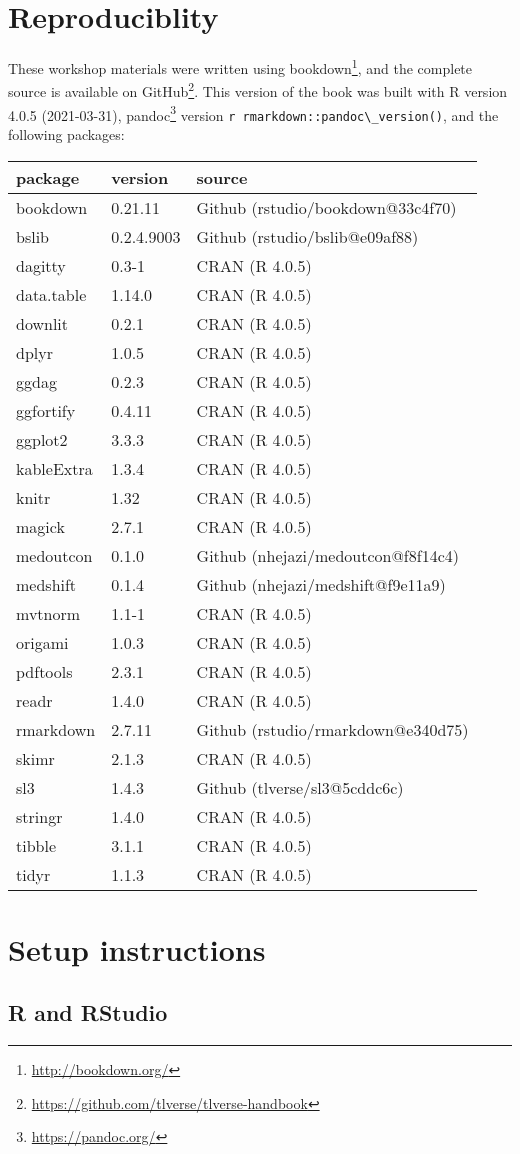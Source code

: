 \documentclass[
  12pt, krantz2,
]{book}
\newcommand{\passthrough}[1]{#1}
\renewcommand{\href}[2]{#2\footnote{\url{#1}}}
\theoremstyle{definition}
\theoremstyle{definition}
\theoremstyle{definition}
\newcommand{\1}{\mathbbm{1}}
\begin{document}
\hypertarget{repro}{%
\section{Reproduciblity}\label{repro}}

These workshop materials were written using \href{http://bookdown.org/}{bookdown},
and the complete source is available on
\href{https://github.com/tlverse/tlverse-handbook}{GitHub}. This version of the book
was built with R version 4.0.5 (2021-03-31), \href{https://pandoc.org/}{pandoc} version \passthrough{\lstinline!r rmarkdown::pandoc\_version()!}, and the following packages:

\begin{longtable}[]{@{}lll@{}}
\toprule
package & version & source\tabularnewline
\midrule
\endhead
bookdown & 0.21.11 & Github (rstudio/bookdown@33c4f70)\tabularnewline
bslib & 0.2.4.9003 & Github (rstudio/bslib@e09af88)\tabularnewline
dagitty & 0.3-1 & CRAN (R 4.0.5)\tabularnewline
data.table & 1.14.0 & CRAN (R 4.0.5)\tabularnewline
downlit & 0.2.1 & CRAN (R 4.0.5)\tabularnewline
dplyr & 1.0.5 & CRAN (R 4.0.5)\tabularnewline
ggdag & 0.2.3 & CRAN (R 4.0.5)\tabularnewline
ggfortify & 0.4.11 & CRAN (R 4.0.5)\tabularnewline
ggplot2 & 3.3.3 & CRAN (R 4.0.5)\tabularnewline
kableExtra & 1.3.4 & CRAN (R 4.0.5)\tabularnewline
knitr & 1.32 & CRAN (R 4.0.5)\tabularnewline
magick & 2.7.1 & CRAN (R 4.0.5)\tabularnewline
medoutcon & 0.1.0 & Github (nhejazi/medoutcon@f8f14c4)\tabularnewline
medshift & 0.1.4 & Github (nhejazi/medshift@f9e11a9)\tabularnewline
mvtnorm & 1.1-1 & CRAN (R 4.0.5)\tabularnewline
origami & 1.0.3 & CRAN (R 4.0.5)\tabularnewline
pdftools & 2.3.1 & CRAN (R 4.0.5)\tabularnewline
readr & 1.4.0 & CRAN (R 4.0.5)\tabularnewline
rmarkdown & 2.7.11 & Github (rstudio/rmarkdown@e340d75)\tabularnewline
skimr & 2.1.3 & CRAN (R 4.0.5)\tabularnewline
sl3 & 1.4.3 & Github (tlverse/sl3@5cddc6c)\tabularnewline
stringr & 1.4.0 & CRAN (R 4.0.5)\tabularnewline
tibble & 3.1.1 & CRAN (R 4.0.5)\tabularnewline
tidyr & 1.1.3 & CRAN (R 4.0.5)\tabularnewline
\bottomrule
\end{longtable}

\hypertarget{setup}{%
\section{Setup instructions}\label{setup}}

\hypertarget{r-and-rstudio}{%
\subsection{R and RStudio}\label{r-and-rstudio}}
\end{document}
